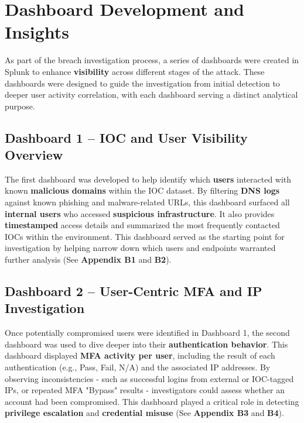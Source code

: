 \documentclass[11pt]{article}
\begin{document}
	\newpage
	\section{Dashboard Development and Insights}
	
	\hspace{1.5em} As part of the breach investigation process, a series of dashboards were created in Splunk to enhance \textbf{visibility} across different stages of the attack. These dashboards were designed to guide the investigation from initial detection to deeper user activity correlation, with each dashboard serving a distinct analytical purpose.
	
	\subsection{Dashboard 1 – IOC and User Visibility Overview}
	
	\hspace{1.5em} The first dashboard was developed to help identify which \textbf{users} interacted with known \textbf{malicious domains} within the IOC dataset. By filtering \textbf{DNS logs} against known phishing and malware-related URLs, this dashboard surfaced all \textbf{internal users} who accessed \textbf{suspicious infrastructure}. It also provides \textbf{timestamped} access details and summarized the most frequently contacted IOCs within the environment. This dashboard served as the starting point for investigation by helping narrow down which users and endpoints warranted further analysis (See \textbf{Appendix B1} and \textbf{B2}).
	
	\subsection{Dashboard 2 – User-Centric MFA and IP Investigation}
	
	\hspace{1.5em} Once potentially compromised users were identified in Dashboard 1, the second dashboard was used to dive deeper into their \textbf{authentication behavior}. This dashboard displayed \textbf{MFA activity per user}, including the result of each authentication (e.g., Pass, Fail, N/A) and the associated IP addresses. By observing inconsistencies - such as successful logins from external or IOC-tagged IPs, or repeated MFA "Bypass" results - investigators could assess whether an account had been compromised. This dashboard played a critical role in detecting \textbf{privilege escalation} and \textbf{credential misuse} (See \textbf{Appendix B3} and \textbf{B4}).
	
\end{document}
